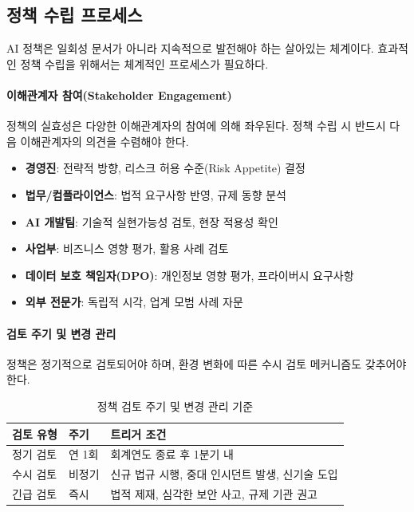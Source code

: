 \subsection{정책 수립 프로세스}
\label{sec:5.1.5}

AI 정책은 일회성 문서가 아니라 지속적으로 발전해야 하는 살아있는 체계이다. 효과적인 정책 수립을 위해서는 체계적인 프로세스가 필요하다.

\paragraph{이해관계자 참여(Stakeholder Engagement)}
정책의 실효성은 다양한 이해관계자의 참여에 의해 좌우된다. 정책 수립 시 반드시 다음 이해관계자의 의견을 수렴해야 한다.

\begin{itemize}
 \item \textbf{경영진}: 전략적 방향, 리스크 허용 수준(Risk Appetite) 결정
 \item \textbf{법무/컴플라이언스}: 법적 요구사항 반영, 규제 동향 분석
 \item \textbf{AI 개발팀}: 기술적 실현가능성 검토, 현장 적용성 확인
 \item \textbf{사업부}: 비즈니스 영향 평가, 활용 사례 검토
 \item \textbf{데이터 보호 책임자(DPO)}: 개인정보 영향 평가, 프라이버시 요구사항
 \item \textbf{외부 전문가}: 독립적 시각, 업계 모범 사례 자문
\end{itemize}

\paragraph{검토 주기 및 변경 관리}
정책은 정기적으로 검토되어야 하며, 환경 변화에 따른 수시 검토 메커니즘도 갖추어야 한다.

\begin{table}[htbp]
\centering
\caption{정책 검토 주기 및 변경 관리 기준}
\label{tab:policy_review_cycle}
\begin{tabularx}{\textwidth}{p{2.5cm}p{2cm}X}
\toprule
\textbf{검토 유형} & \textbf{주기} & \textbf{트리거 조건} \\
\midrule
정기 검토 & 연 1회 & 회계연도 종료 후 1분기 내 \\
수시 검토 & 비정기 & 신규 법규 시행, 중대 인시던트 발생, 신기술 도입 \\
긴급 검토 & 즉시 & 법적 제재, 심각한 보안 사고, 규제 기관 권고 \\
\bottomrule
\end{tabularx}
\end{table}

